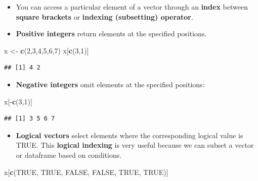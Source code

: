 \documentclass[]{book}
\newenvironment{Shaded}{\begin{snugshade}}{\end{snugshade}}
\newcommand{\KeywordTok}[1]{\textcolor[rgb]{0.13,0.29,0.53}{\textbf{{#1}}}}
\newcommand{\DecValTok}[1]{\textcolor[rgb]{0.00,0.00,0.81}{{#1}}}
\newcommand{\StringTok}[1]{\textcolor[rgb]{0.31,0.60,0.02}{{#1}}}
\newcommand{\OtherTok}[1]{\textcolor[rgb]{0.56,0.35,0.01}{{#1}}}
\newcommand{\NormalTok}[1]{{#1}}
\providecommand{\tightlist}{%
  \setlength{\itemsep}{0pt}\setlength{\parskip}{0pt}}
\begin{document}
\begin{itemize}
\item
  You can access a particular element of a vector through an
  \textbf{index} between \textbf{square brackets} or \textbf{indexing
  (subsetting) operator}.
\item
  \textbf{Positive integers} return elements at the specified positions.
\end{itemize}

\begin{Shaded}
\begin{Highlighting}[]
\NormalTok{x <-}\StringTok{ }\KeywordTok{c}\NormalTok{(}\DecValTok{2}\NormalTok{,}\DecValTok{3}\NormalTok{,}\DecValTok{4}\NormalTok{,}\DecValTok{5}\NormalTok{,}\DecValTok{6}\NormalTok{,}\DecValTok{7}\NormalTok{)}
\NormalTok{x[}\KeywordTok{c}\NormalTok{(}\DecValTok{3}\NormalTok{,}\DecValTok{1}\NormalTok{)]}
\end{Highlighting}
\end{Shaded}

\begin{verbatim}
## [1] 4 2
\end{verbatim}

\begin{itemize}
\tightlist
\item
  \textbf{Negative integers} omit elements at the specified positions:
\end{itemize}

\begin{Shaded}
\begin{Highlighting}[]
\NormalTok{x[-}\KeywordTok{c}\NormalTok{(}\DecValTok{3}\NormalTok{,}\DecValTok{1}\NormalTok{)]}
\end{Highlighting}
\end{Shaded}

\begin{verbatim}
## [1] 3 5 6 7
\end{verbatim}

\begin{itemize}
\tightlist
\item
  \textbf{Logical vectors} select elements where the corresponding
  logical value is TRUE. This \textbf{logical indexing} is very useful
  because we can subset a vector or dataframe based on conditions.
\end{itemize}

\begin{Shaded}
\begin{Highlighting}[]
\NormalTok{x[}\KeywordTok{c}\NormalTok{(}\OtherTok{TRUE}\NormalTok{, }\OtherTok{TRUE}\NormalTok{, }\OtherTok{FALSE}\NormalTok{, }\OtherTok{FALSE}\NormalTok{, }\OtherTok{TRUE}\NormalTok{, }\OtherTok{TRUE}\NormalTok{)]}
\end{Highlighting}
\end{Shaded}
\end{document}
